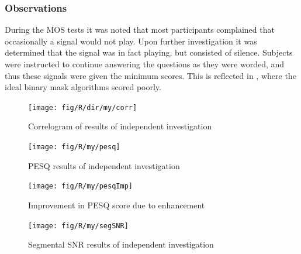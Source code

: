 \subsubsection*{Observations}

During the \ac{MOS} tests it was noted that most participants complained
that occasionally a signal would not play. Upon further investigation
it was determined that the signal was in fact playing, but consisted
of silence. Subjects were instructed to continue answering the questions
as they were worded, and thus these signals were given the minimum
scores. This is reflected in ,
where the ideal binary mask algorithms scored poorly.

\begin{figure}[h]
\noindent \begin{centering}
\texttt{[image: fig/R/dir/my/corr]}
\par\end{centering}

\protect\caption{\label{fig:my-Corr}Correlogram of results of independent investigation}
\end{figure}


\begin{figure}[p]
\noindent \begin{centering}
\texttt{[image: fig/R/my/pesq]}
\par\end{centering}

\protect\caption{\label{fig:my-PESQ}\acs{PESQ} results of independent investigation}
\end{figure}


\begin{figure}[p]
\noindent \begin{centering}
\texttt{[image: fig/R/my/pesqImp]}
\par\end{centering}

\protect\caption{\label{fig:my-PESQ-imp}Improvement in \acs{PESQ} score due to enhancement}
\end{figure}


\begin{figure}[h]
\noindent \begin{centering}
\texttt{[image: fig/R/my/segSNR]}
\par\end{centering}

\protect\caption{\label{fig:my-segSNR}Segmental \acs{SNR} results of independent
investigation}
\end{figure}


